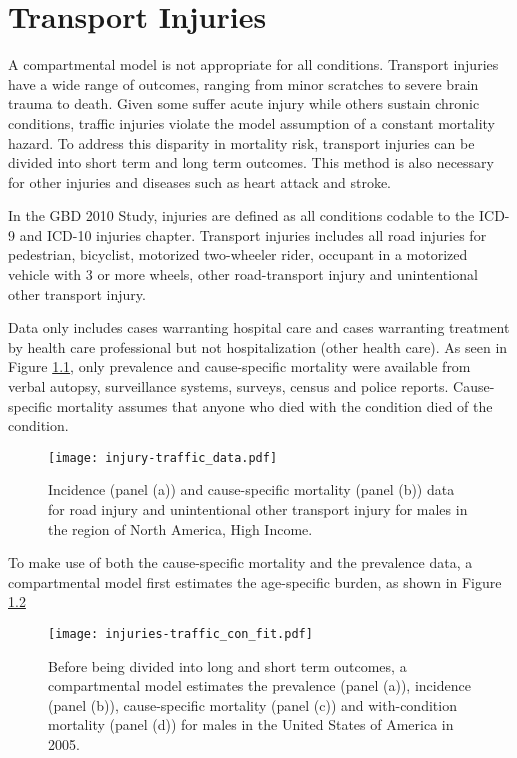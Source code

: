 \chapter{Transport Injuries}
\label{applications-double_dismod}

A compartmental model is not appropriate for all conditions.  Transport injuries have a wide range of outcomes, ranging from minor scratches to severe brain trauma to death.  Given some suffer acute injury while others sustain chronic conditions, traffic injuries violate the model assumption of a constant mortality hazard.  To address this disparity in mortality risk, transport injuries can be divided into short term and long term outcomes.  This method is also necessary for other injuries and diseases such as heart attack and stroke.

In the GBD 2010 Study, injuries are defined as all conditions codable to the ICD-9 and ICD-10 injuries chapter.  Transport injuries includes all road injuries for pedestrian, bicyclist, motorized two-wheeler rider, occupant in a motorized vehicle with 3 or more wheels, other road-transport injury and unintentional other transport injury.

Data only includes cases warranting hospital care and cases warranting treatment by health care professional but not hospitalization (other health care).  As seen in Figure \ref{fig:app-injury traffic data}, only prevalence and cause-specific mortality were available from verbal autopsy, surveillance systems, surveys, census and police reports.  Cause-specific mortality assumes that anyone who died with the condition died of the condition.

    \begin{figure}[h]
        \begin{center}
            \texttt{[image: injury-traffic\_data.pdf]}
            \caption{Incidence (panel (a)) and cause-specific mortality (panel (b)) data for road injury and unintentional other transport injury for males in the region of North America, High Income.}
            \label{fig:app-injury traffic data}
        \end{center}
    \end{figure}

To make use of both the cause-specific mortality and the prevalence data, a compartmental model first estimates the age-specific burden, as shown in Figure \ref{fig:app-injury traffic fit}

    \begin{figure}[h]
        \begin{center}
            \texttt{[image: injuries-traffic\_con\_fit.pdf]}
            \caption{Before being divided into long and short term outcomes, a compartmental model estimates the prevalence (panel (a)), incidence (panel (b)), cause-specific mortality (panel (c)) and with-condition mortality (panel (d)) for males in the United States of America in 2005.}
            \label{fig:app-injury traffic fit}
        \end{center}
    \end{figure}

